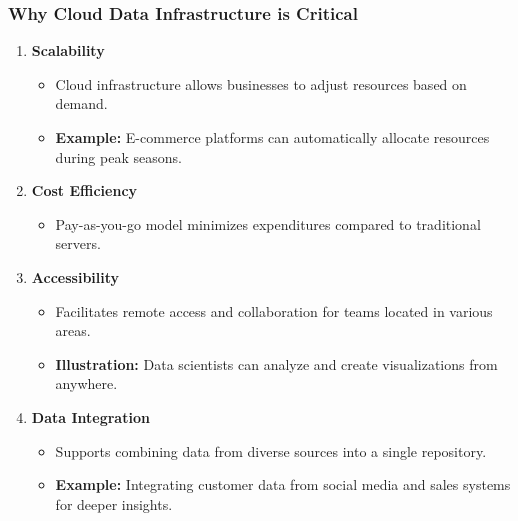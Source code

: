 \documentclass[aspectratio=169]{beamer}
\begin{document}
\begin{frame}[fragile]
    \frametitle{Why Cloud Data Infrastructure is Critical}
    \begin{enumerate}
        \item \textbf{Scalability}
        \begin{itemize}
            \item Cloud infrastructure allows businesses to adjust resources based on demand.
            \item \textbf{Example:} E-commerce platforms can automatically allocate resources during peak seasons.
        \end{itemize}
        
        \item \textbf{Cost Efficiency}
        \begin{itemize}
            \item Pay-as-you-go model minimizes expenditures compared to traditional servers.
        \end{itemize}

        \item \textbf{Accessibility}
        \begin{itemize}
            \item Facilitates remote access and collaboration for teams located in various areas.
            \item \textbf{Illustration:} Data scientists can analyze and create visualizations from anywhere.
        \end{itemize}

        \item \textbf{Data Integration}
        \begin{itemize}
            \item Supports combining data from diverse sources into a single repository.
            \item \textbf{Example:} Integrating customer data from social media and sales systems for deeper insights.
        \end{itemize}
    \end{enumerate}
\end{frame}
\end{document}
